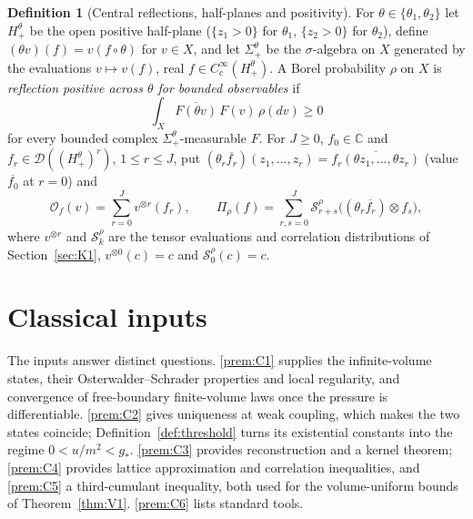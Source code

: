 \documentclass[11pt]{article}
\theoremstyle{plain}
\theoremstyle{definition}
\newtheorem{definition}[theorem]{Definition}
\theoremstyle{remark}
\newcommand{\C}{\mathbb{C}}
\newcommand{\cD}{\mathcal{D}}
\newcommand{\cO}{\mathcal{O}}
\newcommand{\cS}{\mathcal{S}}
\newcommand{\conj}[1]{\overline{#1}}
\begin{document}
\begin{definition}[Central reflections, half-planes and positivity]\label{def:reflections}
For $\theta\in\{\theta_1,\theta_2\}$ let $H^{\theta}_{+}$ be the open positive
half-plane ($\{z_1>0\}$ for $\theta_1$, $\{z_2>0\}$ for $\theta_2$), define
$(\theta v)(f)=v(f\circ\theta)$ for $v\in X$, and let $\Sigma^{\theta}_{+}$ be the
$\sigma$-algebra on $X$ generated by the evaluations $v\mapsto v(f)$, real
$f\in C_c^{\infty}(H^{\theta}_{+})$. A Borel probability $\rho$ on $X$ is
\emph{reflection positive across $\theta$ for bounded observables} if
\begin{equation}\label{eq:boundedRP}
\int_{X}\conj{F(\theta v)}\,F(v)\,\rho(dv)\ge0
\end{equation}
for every bounded complex $\Sigma^{\theta}_{+}$-measurable $F$. For $J\ge0$,
$f_0\in\C$ and $f_r\in\cD((H^{\theta}_{+})^{r})$, $1\le r\le J$, put
$(\theta_r\conj{f_r})(z_1,\dots,z_r)=\conj{f_r(\theta z_1,\dots,\theta z_r)}$ (value
$\conj{f_0}$ at $r=0$) and
\begin{equation}\label{eq:polyform}
\cO_f(v)=\sum_{r=0}^{J}v^{\otimes r}(f_r),\qquad
\Pi_{\rho}(f)=\sum_{r,s=0}^{J}\cS^{\rho}_{r+s}\bigl((\theta_r\conj{f_r})\otimes f_s\bigr),
\end{equation}
where $v^{\otimes r}$ and $\cS^{\rho}_{k}$ are the tensor evaluations and
correlation distributions of Section~\ref{sec:K1}, $v^{\otimes 0}(c)=c$ and
$\cS^{\rho}_{0}(c)=c$.
\end{definition}

\section{Classical inputs}\label{sec:classical}

The inputs answer distinct questions. \ref{prem:C1} supplies the infinite-volume states, their Osterwalder--Schrader properties and local regularity, and convergence of free-boundary finite-volume laws once the pressure is differentiable. \ref{prem:C2} gives uniqueness at weak coupling, which makes the two states coincide; Definition~\ref{def:threshold} turns its existential constants into the regime $0<u/m^{2}<g_{*}$. \ref{prem:C3} provides reconstruction and a kernel theorem; \ref{prem:C4} provides lattice approximation and correlation inequalities, and \ref{prem:C5} a third-cumulant inequality, both used for the volume-uniform bounds of Theorem~\ref{thm:V1}. \ref{prem:C6} lists standard tools.
\end{document}
